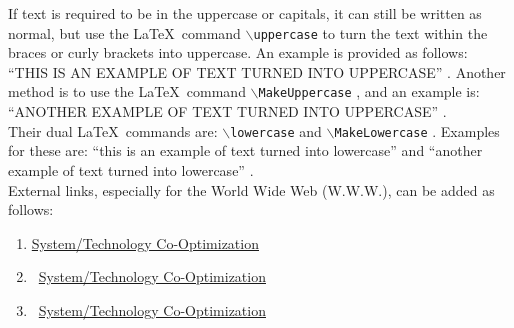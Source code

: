 If text is required to be in the uppercase or capitals, it can still be written as normal, but use the \LaTeX\ command {\tt $\backslash$uppercase} to turn the text within the braces or curly brackets into uppercase. An example is provided as follows: ``\uppercase{This is an Example of Text Turned into UpperCase}'' \cite[\S8.2.4, pp. 239]{Syropoulos2003}. Another method is to use the \LaTeX\ command {\tt $\backslash$MakeUppercase} \cite[\S Appendix G.1, pp. 512]{Kopka2004}, and an example is: ``\MakeUppercase{Another Example of Text Turned into UpperCase}'' \cite[\S6.8, pp. 47; \S23.2, pp. 212--213]{Greenwade2022} \cite[\S2.2.2, pp. 31; \S3.1.5, pp. 85--87; \S3.1.7, pp. 91; \S4.4.2, pp. 229; \S9.4.1, pp. 571]{Mittelbach2004} \cite[\S3.5, pp. 60]{Syropoulos2003} \cite[\S5, Changing Letter Case]{Ying20XY}. \\

Their dual \LaTeX\ commands are: {\tt $\backslash$lowercase} and {\tt $\backslash$MakeLowercase} \cite[\S Appendix G.1, pp. 512]{Kopka2004}. Examples for these are: ``\lowercase{This is an Example of Text Turned into LowerCase}'' \cite[\S8.2.4, pp. 239]{Syropoulos2003} and ``\MakeLowercase{Another Example of Text Turned into LowerCase}'' \cite[\S23.2, pp. 212--213]{Greenwade2022} \cite[\S2.2.6, pp. 37; \S3.1.5, pp. 85--87; \S7.3.1, pp. 341; \S9.4.1, pp. 571]{Mittelbach2004} \cite[\S3.5, pp. 60]{Syropoulos2003} \cite[\S5, Changing Letter Case]{Ying20XY}. \\




External links, especially for the World Wide Web (W.W.W.), can be added as follows: \vspace{-0.3cm}
\begin{enumerate} \itemsep -4pt
\item \faYoutube \href{https://www.youtube.com/watch?v=TpGMCQCWd4M}{System/Technology Co-Optimization}
\item \faLink\ \href{https://www.youtube.com/watch?v=TpGMCQCWd4M}{System/Technology Co-Optimization}
\item \faExternalLink*\ \href{https://www.youtube.com/watch?v=TpGMCQCWd4M}{System/Technology Co-Optimization}
\end{enumerate}

















